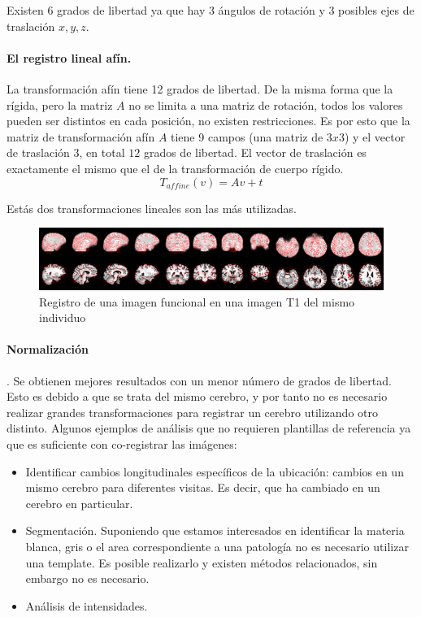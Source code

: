 Existen $6$ grados de libertad ya que hay 3 ángulos de rotación y 3 posibles ejes de traslación $x,y,z$. 

\paragraph{El registro lineal afín.} La transformación afín tiene 12 grados de libertad. De la misma forma que la rígida, pero la matriz $A$ no se limita a una matriz de rotación, todos los valores pueden ser distintos en cada posición, no existen restricciones.
Es por esto que la matriz de transformación afín $A$ tiene 9 campos (una matriz de $3x3$) y el vector de traslación $3$, en total $12$ grados de libertad.
El vector de traslación es exactamente el mismo que el de la transformación de cuerpo rígido.
$$T_{affine}(v) = Av + t$$

Estás dos transformaciones lineales son las más utilizadas. 

\begin{figure}[H]
  \centering
    \includegraphics[scale=0.75]{img/func2t1.png}
  \caption{Registro de una imagen funcional en una imagen T1 del mismo individuo}         \label{preproc:func2t1}
\end{figure}

\paragraph{Normalización}. Se obtienen mejores resultados con un menor número de grados de libertad. Esto es debido a que se trata del mismo cerebro, y por tanto no es necesario realizar grandes transformaciones para registrar un cerebro utilizando otro distinto.
Algunos ejemplos de análisis que no requieren plantillas de referencia ya que es suficiente con co-registrar las imágenes:
\begin{itemize}
 \item Identificar cambios longitudinales específicos de la ubicación: cambios en un mismo cerebro para diferentes visitas. Es decir, que ha cambiado en un cerebro en particular.
 \item Segmentación. Suponiendo que estamos interesados en identificar la materia blanca, gris o el area correspondiente a una patología no es necesario utilizar una template. Es posible realizarlo y existen métodos relacionados, sin embargo no es necesario.
 \item Análisis de intensidades.
\end{itemize}

